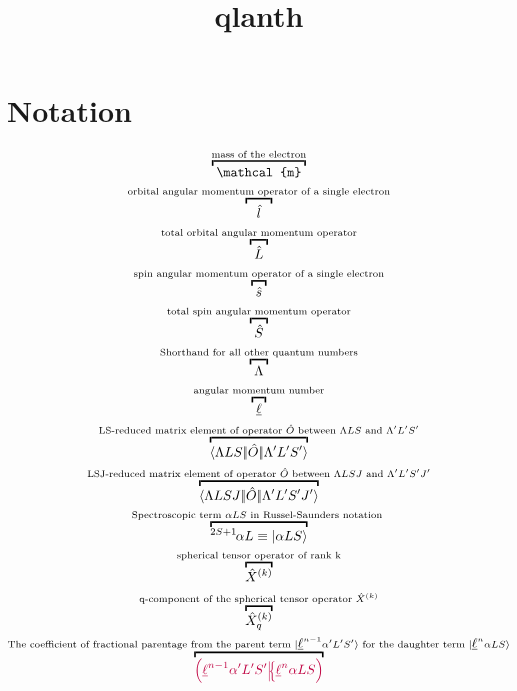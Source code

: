 \documentclass{article}
\begin{document}
\title{qlanth}
\author{}
\date{}
\maketitle

\section{Notation}

\begin{gather}
    \overbracket{\,\,\mathcal{m}\,\,}^{\text{mass of the electron}} \\
    \overbracket{\,\,\,\,\,\op{l}\,\,\,\,\,}^{\text{orbital angular momentum operator of a single electron}} \\
    \overbracket{\,\,\op{L}\,\,}^{\text{total orbital angular momentum  operator}} \\
    \overbracket{\,\,\op{s}\,\,}^{\text{spin angular momentum  operator of a single electron}} \\
    \overbracket{\,\,\op{S}\,\,}^{\text{total spin angular momentum operator}} \\
    \overbracket{\,\,\Lambda\,\,}^{\text{Shorthand for all other quantum numbers}} \\ 
    \overbracket{\,\,\lorb\,\,}^{\text{angular momentum number}} \\
    \overbracket{\redbraopket{\Lambda LS}{\op{O}}{\Lambda' L'S'}}^{\text{LS-reduced matrix element of operator }\hat{O}\text{ between }{\Lambda LS} \text{ and } {\Lambda' L'S'}} \\
    \overbracket{\redbraopket{\Lambda LSJ}{\op{O}}{\Lambda' L'S'J'}}^{\text{LSJ-reduced matrix element of operator }\hat{O}\text{ between }{\Lambda LSJ} \text{ and } {\Lambda' L'S'J'}} \\
    \overbracket{\LSterm{2 S + 1}{\alpha{L}}\equiv \ket{\alpha{LS}}}^{\text{Spectroscopic term } {\alpha{LS}} \text{ in Russel-Saunders notation }} \\
    \overbracket{\op{X}^{(k)}}^{\text{spherical tensor operator of rank k}} \\
    \overbracket{\op{X}_q^{(k)}}^{\text{q-component of the spherical tensor operator }\op{X}^{(k)}} \\
    \overbracket{\cfp{\lorb^{n-1}\alpha'L'S'}{\lorb^n\alpha{L}{S}}}^{\text{The coefficient of fractional parentage from the parent term }\ket{\lorb^{n-1}\alpha'{L'S'}}\text{ for the daughter term }\ket{\lorb^{n}\alpha{LS}}}  
\end{gather}
\end{document}
